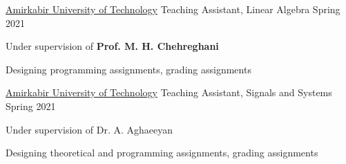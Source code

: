 \begin{cventries}
  \cventry
    {\href{https://aut.ac.ir/}{Amirkabir University of Technology}} %
    {Teaching Assistant, Linear Algebra} %
    {} %
    {Spring 2021} %
    {
      \begin{cvitems} %
        \item {Under supervision of \textbf{Prof. M. H. Chehreghani}}
        \item {Designing programming assignments, grading assignments}
      \end{cvitems}
    }

  \cventry
    {\href{https://aut.ac.ir/}{Amirkabir University of Technology}} %
    {Teaching Assistant, Signals and Systems} %
    {} %
    {Spring 2021} %
    {
      \begin{cvitems} %
        \item {Under supervision of Dr. A. Aghaeeyan}
        \item {Designing theoretical and programming assignments, grading assignments}
      \end{cvitems}
    }

\end{cventries}